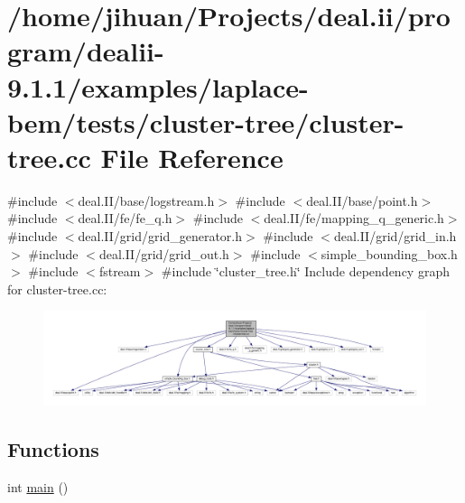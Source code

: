 \hypertarget{cluster-tree_8cc}{}\section{/home/jihuan/\+Projects/deal.ii/program/dealii-\/9.1.1/examples/laplace-\/bem/tests/cluster-\/tree/cluster-\/tree.cc File Reference}
\label{cluster-tree_8cc}
{\ttfamily \#include $<$deal.\+I\+I/base/logstream.\+h$>$}\newline
{\ttfamily \#include $<$deal.\+I\+I/base/point.\+h$>$}\newline
{\ttfamily \#include $<$deal.\+I\+I/fe/fe\+\_\+q.\+h$>$}\newline
{\ttfamily \#include $<$deal.\+I\+I/fe/mapping\+\_\+q\+\_\+generic.\+h$>$}\newline
{\ttfamily \#include $<$deal.\+I\+I/grid/grid\+\_\+generator.\+h$>$}\newline
{\ttfamily \#include $<$deal.\+I\+I/grid/grid\+\_\+in.\+h$>$}\newline
{\ttfamily \#include $<$deal.\+I\+I/grid/grid\+\_\+out.\+h$>$}\newline
{\ttfamily \#include $<$simple\+\_\+bounding\+\_\+box.\+h$>$}\newline
{\ttfamily \#include $<$fstream$>$}\newline
{\ttfamily \#include \char`\"{}cluster\+\_\+tree.\+h\char`\"{}}\newline
Include dependency graph for cluster-\/tree.cc\+:\nopagebreak
\begin{figure}[H]
\begin{center}
\leavevmode
\includegraphics[width=350pt]{cluster-tree_8cc__incl}
\end{center}
\end{figure}
\subsection*{Functions}
\begin{DoxyCompactItemize}
\item 
int \hyperlink{cluster-tree_8cc_ae66f6b31b5ad750f1fe042a706a4e3d4}{main} ()
\end{DoxyCompactItemize}


